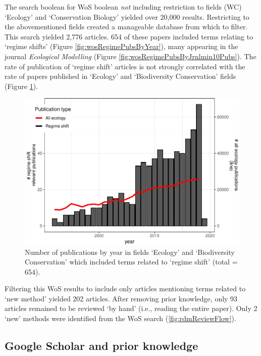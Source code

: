 \documentclass[12pt,twoside,openany]{reedthesis}
\begin{document}
The search boolean for WoS boolean \emph{not} including restriction to fields (WC) `Ecology' and `Conservation Biology' yielded over 20,000 results. Restricting to the abovementioned fields created a manageable database from which to filter. This search yielded 2,776 articles. 654 of these papers included terms relating to `regime shifts' (Figure \ref{fig:wosRegimePubsByYear}), many appearing in the journal \emph{Ecological Modelling} (Figure \ref{fig:wosRegimePubsByJrnlmin10Pubs}). The rate of publication of `regime shift' articles is not strongly correlated with the rate of papers published in `Ecology' and `Biodiversity Conservation' fields (Figure \ref{fig:wosRegimePubsByYearwithNumEcolPubs}).
\begin{figure}
\centering
\includegraphics{_myDissertation_files/figure-latex/wosRegimePubsByYearwithNumEcolPubs-1.pdf}
\caption{\label{fig:wosRegimePubsByYearwithNumEcolPubs}Number of publications by year in fields `Ecology' and `Biodiversity Conservation' which included terms related to `regime shift' (total = 654).}
\end{figure}
Filtering this WoS results to include only articles mentioning terms related to `new method' yielded 202 articles. After removing prior knowledge, only 93 articles remained to be reviewed `by hand' (i.e., reading the entire paper). Only 2 `new' methods were identified from the WoS search (\ref{fig:rdmReviewFlow}).

\hypertarget{google-scholar-and-prior-knowledge}{%
\subsection{Google Scholar and prior knowledge}\label{google-scholar-and-prior-knowledge}}
\end{document}
